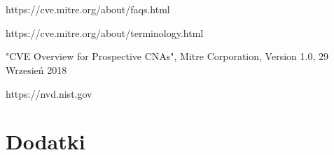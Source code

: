 \documentclass[a4paper,12pt,twoside]{article}
\begin{document}
\newpage
\thispagestyle{empty}
\mbox{}

\newpage
\section*{ }

\renewcommand{\refname}{Bibliografia}
\begin{thebibliography}{}


https://cve.mitre.org/about/faqs.html

https://cve.mitre.org/about/terminology.html

"CVE Overview for Prospective CNAs", Mitre Corporation, Version 1.0, 29 Wrzesień 2018

https://nvd.nist.gov
  

\end{thebibliography}

\newpage
\section*{ }
\listoffigures
\newpage
{}

\newpage
\section*{ }
\listoftables
\newpage
{}

\newpage
\section*{ }
\renewcommand{\lstlistlistingname}{Spis listingów}
\lstlistoflistings 
\newpage
{}



\newpage
\section*{Dodatki}
\paragraph{}
\end{document}
